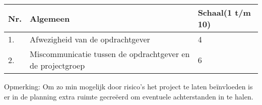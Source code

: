 \begin{tabular}{ | l | l | l | }
    \hline
    Nr. & Algemeen & Schaal(1 t/m 10) \\ \hline
    1.	& Afwezigheid van de opdrachtgever & 4 \\ \hline
    2.  & Miscommunicatie tussen de opdrachtgever en de projectgroep & 6 \\ \hline
\end{tabular}

\bigskip
Opmerking: Om zo min mogelijk door risico’s het project te laten beïnvloeden is er in de planning extra ruimte gecreëerd om eventuele achterstanden in te halen.